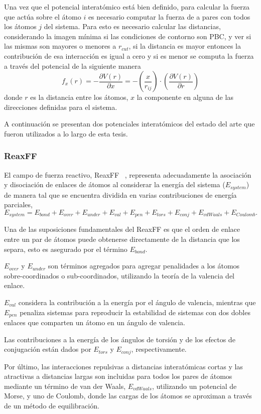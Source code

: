 Una vez que el potencial interatómico está bien definido, para calcular la fuerza
que actúa sobre el átomo $i$ es necesario computar la fuerza de a pares con todos
los átomos $j$ del sistema. Para esto es necesario calcular las distancias,
considerando la imagen mínima si las condiciones de contorno son PBC, y ver si
las mismas son mayores o menores a $r_{cut}$, si la distancia es mayor entonces
la contribución de esa interacción es igual a cero y si es menor se computa la 
fuerza a través del potencial de la siguiente manera
$$
f_x(r) = - \frac{\partial V(r)}{\partial x}
       = - \left( \frac{x}{r_{ij}} \right) \cdot \left( \frac{\partial V(r)}{\partial r} \right)
$$
donde $r$ es la distancia entre los átomos, $x$ la componente en alguna de
las direcciones definidas para el sistema.

A continuación se presentan dos potenciales interatómicos del estado del arte que
fueron utilizados a lo largo de esta tesis.

\subsubsection{ReaxFF}

El campo de fuerza reactivo, ReaxFF ~\cite{reaxff}, representa adecuadamente la
asociación y disociación de enlaces de átomos al considerar la energía del sistema
($E_{system}$) de manera tal que se encuentra dividida en varias contribuciones 
de energía parciales,
$$
E_{system} = E_{bond} + E_{over} + E_{under} + E_{val} + E_{pen} + E_{tors} + E_{conj} + E_{vdWaals} + E_{Coulomb}.
$$

Una de las suposiciones fundamentales del ReaxFF es que el orden de enlace entre
un par de átomos puede obtenerse directamente de la distancia que los separa, 
esto es asegurado por el término $E_{bond}$.

$E_{over}$ y $E_{under}$ son términos agregados para agregar penalidades a los
átomos sobre-coordinados o sub-coordinados, utilizando la teoría de la valencia del
enlace.

$E_{val}$ considera la contribución a la energía por el ángulo de valencia, 
mientras que $E_{pen}$ penaliza sistemas para reproducir la estabilidad de 
sistemas con dos dobles enlaces que comparten un átomo en un ángulo de valencia.

Las contribuciones a la energía de los ángulos de torsión y de los efectos de 
conjugación están dados por $E_{tors}$ y $E_{conj}$, respectivamente.

Por último, las interacciones repulsivas a distancias interatómicas cortas y 
las atractivas a distancias largas son incluidas para todos los pares de átomos
mediante un término de van der Waals, $E_{vdWaals}$, utilizando un potencial de 
Morse, y uno de Coulomb, donde las cargas de los átomos se aproximan a través de 
un método de equilibración.


